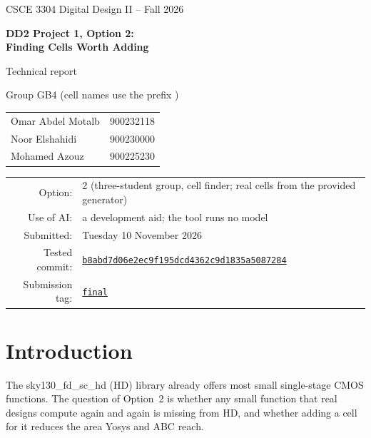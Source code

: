 \documentclass[10pt,a4paper]{article}
\newcommand{\cell}[1]{\texttt{\detokenize{#1}}}
\begin{document}
\begin{titlepage}
\centering
\vspace*{3cm}
{\Large CSCE 3304 Digital Design II -- Fall 2026\par}
\vspace{0.6cm}
{\LARGE\bfseries DD2 Project 1, Option 2:\\[0.2cm] Finding Cells Worth Adding\par}
\vspace{0.4cm}
{\large Technical report\par}
\vspace{1.5cm}
{\large Group GB4 (cell names use the prefix \cell{dd2_g4__})\par}
\vspace{0.6cm}
\begin{tabular}{ll}
Omar Abdel Motalb & 900232118\\
Noor Elshahidi & 900230000\\
Mohamed Azouz & 900225230\\
\end{tabular}
\vspace{1.2cm}

\begin{tabular}{rl}
Option: & 2 (three-student group, cell finder; real cells from the provided generator)\\
Use of AI: & a development aid; the tool runs no model\\
Submitted: & Tuesday 10 November 2026\\
Tested commit: & \href{https://github.com/IOI-dot/dd2-cell-finder/commit/b8abd7d06e2ec9f195dcd4362c9d1835a5087284}{\texttt{b8abd7d06e2ec9f195dcd4362c9d1835a5087284}}\\
Submission tag: & \href{https://github.com/IOI-dot/dd2-cell-finder/tree/final}{\texttt{final}}\\
\end{tabular}
\end{titlepage}

\section{Introduction}

The sky130\_fd\_sc\_hd (HD) library already offers most small single-stage CMOS functions.
The question of Option~2 is whether any small function that real designs compute again and
again is missing from HD, and whether adding a cell for it reduces the area Yosys and ABC reach.
\end{document}
